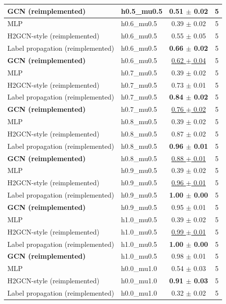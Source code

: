 \begin{tabular}{llcc}
\textbf{GCN (reimplemented)} & h0.5\_mu0.5 & \textbf{0.51 $\pm$ 0.02} & 5 \\
\midrule
MLP & h0.6\_mu0.5 & 0.39 $\pm$ 0.02 & 5 \\
H2GCN-style (reimplemented) & h0.6\_mu0.5 & 0.55 $\pm$ 0.05 & 5 \\
Label propagation (reimplemented) & h0.6\_mu0.5 & \textbf{0.66 $\pm$ 0.02} & 5 \\
\textbf{GCN (reimplemented)} & h0.6\_mu0.5 & \underline{0.62 $\pm$ 0.04} & 5 \\
\midrule
MLP & h0.7\_mu0.5 & 0.39 $\pm$ 0.02 & 5 \\
H2GCN-style (reimplemented) & h0.7\_mu0.5 & 0.73 $\pm$ 0.01 & 5 \\
Label propagation (reimplemented) & h0.7\_mu0.5 & \textbf{0.84 $\pm$ 0.02} & 5 \\
\textbf{GCN (reimplemented)} & h0.7\_mu0.5 & \underline{0.76 $\pm$ 0.02} & 5 \\
\midrule
MLP & h0.8\_mu0.5 & 0.39 $\pm$ 0.02 & 5 \\
H2GCN-style (reimplemented) & h0.8\_mu0.5 & 0.87 $\pm$ 0.02 & 5 \\
Label propagation (reimplemented) & h0.8\_mu0.5 & \textbf{0.96 $\pm$ 0.01} & 5 \\
\textbf{GCN (reimplemented)} & h0.8\_mu0.5 & \underline{0.88 $\pm$ 0.01} & 5 \\
\midrule
MLP & h0.9\_mu0.5 & 0.39 $\pm$ 0.02 & 5 \\
H2GCN-style (reimplemented) & h0.9\_mu0.5 & \underline{0.96 $\pm$ 0.01} & 5 \\
Label propagation (reimplemented) & h0.9\_mu0.5 & \textbf{1.00 $\pm$ 0.00} & 5 \\
\textbf{GCN (reimplemented)} & h0.9\_mu0.5 & 0.95 $\pm$ 0.01 & 5 \\
\midrule
MLP & h1.0\_mu0.5 & 0.39 $\pm$ 0.02 & 5 \\
H2GCN-style (reimplemented) & h1.0\_mu0.5 & \underline{0.99 $\pm$ 0.01} & 5 \\
Label propagation (reimplemented) & h1.0\_mu0.5 & \textbf{1.00 $\pm$ 0.00} & 5 \\
\textbf{GCN (reimplemented)} & h1.0\_mu0.5 & 0.98 $\pm$ 0.01 & 5 \\
\midrule
MLP & h0.0\_mu1.0 & 0.54 $\pm$ 0.03 & 5 \\
H2GCN-style (reimplemented) & h0.0\_mu1.0 & \textbf{0.91 $\pm$ 0.03} & 5 \\
Label propagation (reimplemented) & h0.0\_mu1.0 & 0.32 $\pm$ 0.02 & 5 \\

\end{tabular}
